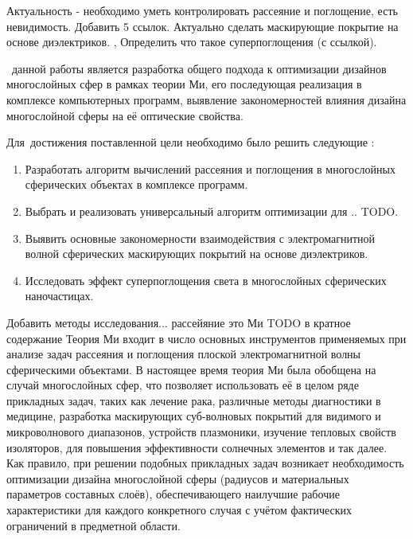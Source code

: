 {\actuality} 


Актуальность - необходимо уметь контролировать рассеяние и поглощение,
есть невидимость. Добавить 5 ссылок. Актуально сделать маскирующие
покрытие на основе диэлектриков. , Определить что
такое суперпоглощения (с ссылкой).~\cite{Jingqiao-JADE-2009} 

\aim\ данной работы является разработка общего подхода к оптимизации
дизайнов многослойных сфер в рамках теории Ми, его последующая
реализация в комплексе компьютерных программ, выявление
закономерностей влияния дизайна многослойной сферы на её оптические
свойства.

Для~достижения поставленной цели необходимо было решить следующие {\tasks}:
\begin{enumerate}
  \item Разработать алгоритм вычислений рассеяния и поглощения в
    многослойных сферических объектах  в комплексе программ.
  \item Выбрать и реализовать универсальный алгоритм оптимизации для
    .. TODO.
  \item Выявить основные закономерности взаимодействия с
    электромагнитной волной сферических маскирующих покрытий на
    основе диэлектриков.
  \item Исследовать эффект суперпоглощения света в многослойных
    сферических наночастицах.
\end{enumerate}

Добавить методы исследования... рассейяние это Ми
TODO в кратное содержание
Теория Ми входит в число основных инструментов
применяемых при анализе задач рассеяния и поглощения плоской
электромагнитной волны сферическими объектами.  В настоящее время
теория Ми была обобщена на случай многослойных сфер, что позволяет
использовать её в целом ряде прикладных задач, таких как лечение рака,
различные методы диагностики в медицине, разработка маскирующих
суб-волновых покрытий для видимого и микроволнового диапазонов,
устройств плазмоники, изучение тепловых свойств изоляторов, для
повышения эффективности солнечных элементов и так далее.  Как правило,
при решении подобных прикладных задач возникает необходимость
оптимизации дизайна многослойной сферы (радиусов и материальных
параметров составных слоёв), обеспечивающего наилучшие рабочие
характеристики для каждого конкретного случая с учётом фактических
ограничений в предметной области.



